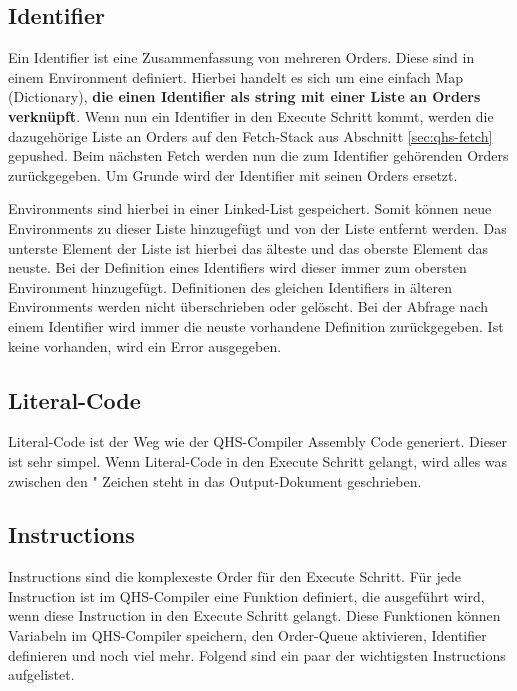 \subsection{Identifier}
Ein Identifier ist eine Zusammenfassung von mehreren Orders. Diese sind in einem Environment definiert. Hierbei handelt es sich um eine einfach Map (Dictionary), \textbf{die einen Identifier als string mit einer Liste an Orders verknüpft}.
Wenn nun ein Identifier in den Execute Schritt kommt, werden die dazugehörige Liste an Orders auf den Fetch-Stack aus Abschnitt \ref{sec:qhs-fetch} gepushed.
Beim nächsten Fetch werden nun die zum Identifier gehörenden Orders zurückgegeben. Um Grunde wird der Identifier mit seinen Orders ersetzt.

Environments sind hierbei in einer Linked-List gespeichert. Somit können neue Environments zu dieser Liste hinzugefügt und von der Liste entfernt werden. Das unterste Element der Liste ist hierbei das älteste und das oberste Element das neuste.
Bei der Definition eines Identifiers wird dieser immer zum obersten Environment hinzugefügt. Definitionen des gleichen Identifiers in älteren Environments werden nicht überschrieben oder gelöscht.
Bei der Abfrage nach einem Identifier wird immer die neuste vorhandene Definition zurückgegeben. Ist keine vorhanden, wird ein Error ausgegeben.

\subsection{Literal-Code}
Literal-Code ist der Weg wie der QHS-Compiler Assembly Code generiert. Dieser ist sehr simpel. Wenn Literal-Code in den Execute Schritt gelangt, wird alles was zwischen den " Zeichen steht in das Output-Dokument geschrieben.

\subsection{Instructions}
Instructions sind die komplexeste Order für den Execute Schritt. Für jede Instruction ist im QHS-Compiler eine Funktion definiert, die ausgeführt wird, wenn diese Instruction in den Execute Schritt gelangt.
Diese Funktionen können Variabeln im QHS-Compiler speichern, den Order-Queue aktivieren, Identifier definieren und noch viel mehr. Folgend sind ein paar der wichtigsten Instructions aufgelistet.

